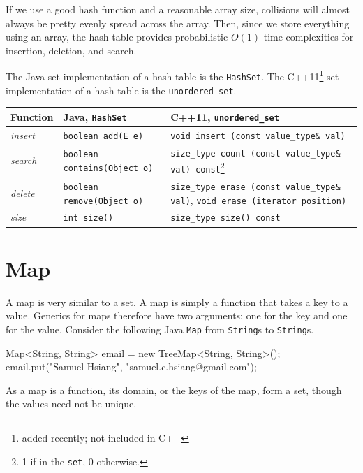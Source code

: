If we use a good hash function and a reasonable array size, collisions will almost always be pretty evenly spread across the array. Then, since we store everything using an array, the hash table provides probabilistic $O(1)$ time complexities for insertion, deletion, and search.

The Java set implementation of a hash table is the \texttt{HashSet}. The C++11\footnote{added recently; not included in C++} set implementation of a hash table is the \texttt{unordered\_set}.

\begin{center}
    \begin{tabular}{ | p{5cm} | p{5cm} | p{5cm} | }
      \hline
      \textbf{Function}	&	\textbf{Java, \texttt{HashSet}}	&	\textbf{C++11, \texttt{unordered\_set}} \\ \hline
      \textit{insert}		&	\texttt{boolean add(E e)}	&	\texttt{void insert (const value\_type\& val)} \\ \hline
      \textit{search}		&	\texttt{boolean contains(Object o)}	&	\texttt{size\_type count (const value\_type\& val) const}\footnote{1 if in the \texttt{set}, 0 otherwise.}	\\ \hline
      \textit{delete}		&	\texttt{boolean	remove(Object o)}		&	\texttt{size\_type erase (const value\_type\& val)}, \texttt{void erase (iterator position)} \\ \hline
      \textit{size} & \texttt{int size()} & \texttt{size\_type size() const} \\ \hline
    \end{tabular}
  \end{center}

\section{Map}

A map is very similar to a set. A map is simply a function that takes a key to a value. Generics for maps therefore have two arguments: one for the key and one for the value. Consider the following Java \texttt{Map} from \texttt{String}s to \texttt{String}s.

\begin{mylstlisting}
Map<String, String> email = new TreeMap<String, String>();
email.put("Samuel Hsiang", "samuel.c.hsiang@gmail.com");
\end{mylstlisting}

As a map is a function, its domain, or the keys of the map, form a set, though the values need not be unique.

